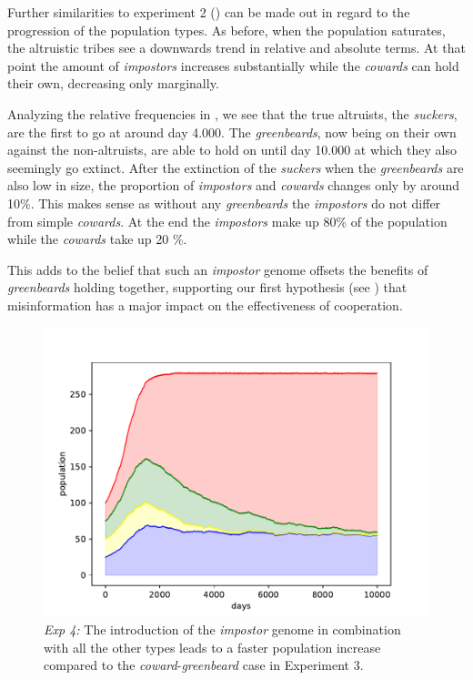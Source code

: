 \documentclass[sigconf]{acmart}
\newcommand{\cowards}{\textit{cowards}\xspace}
\newcommand{\coward}{\textit{coward}\xspace}
\newcommand{\suckers}{\textit{suckers}\xspace}
\newcommand{\impostors}{\textit{impostors}\xspace}
\newcommand{\impostor}{\textit{impostor}\xspace}
\newcommand{\greenbeards}{\textit{greenbeards}\xspace}
\newcommand{\greenbeard}{\textit{greenbeard}\xspace}
\begin{document}
    Further similarities to experiment 2 () can be made out in regard to the progression of the population types.
    As before, when the population saturates, the altruistic tribes see a downwards trend in relative and absolute terms.
    At that point the amount of \impostors increases substantially while the \cowards can hold their own, decreasing only marginally.

    Analyzing the relative frequencies in , we see that the true altruists, the \suckers, are the first to go at around day 4.000.
    The \greenbeards, now being on their own against the non-altruists, are able to hold on until day 10.000 at which they also seemingly go extinct.
    After the extinction of the \suckers when the \greenbeards are also low in size, the proportion of \impostors and \cowards changes only by around 10\%.
    This makes sense as without any \greenbeards the \impostors do not differ from simple \cowards.
    At the end the \impostors make up 80\% of the population while the \cowards take up 20 \%.

    This adds to the belief that such an \impostor genome offsets the benefits of \greenbeards holding together, supporting our first hypothesis (see ) that misinformation has a major impact on the effectiveness of cooperation.


    \begin{figure}[t]
        \includegraphics[width=\columnwidth]{figures/exp4_impostor}
        \caption{\textit{Exp 4:} The introduction of the \impostor genome in combination with all the other types leads to a faster population increase compared to the \coward-\greenbeard case in Experiment 3.}
        \label{fig:exp4_impostor}
    \end{figure}
\end{document}
